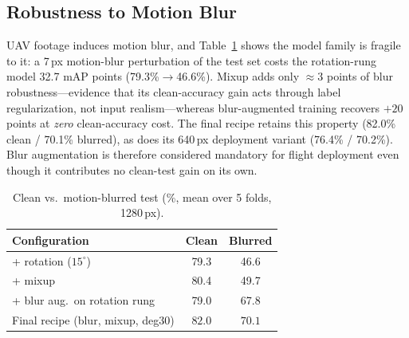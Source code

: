 
\subsection{Robustness to Motion Blur}
\label{sec:robust}
UAV footage induces motion blur, and Table~\ref{tab:blur} shows the model family is fragile to it: a 7\,px motion-blur perturbation of the test set costs the rotation-rung model 32.7 mAP points (79.3\%$\to$46.6\%). Mixup adds only ${\approx}3$ points of blur robustness---evidence that its clean-accuracy gain acts through label regularization, not input realism---whereas blur-augmented training recovers $+20$ points at \emph{zero} clean-accuracy cost. The final recipe retains this property (82.0\% clean / 70.1\% blurred), as does its 640\,px deployment variant (76.4\% / 70.2\%). Blur augmentation is therefore considered mandatory for flight deployment even though it contributes no clean-test gain on its own.

\begin{table}[t]
\caption{Clean vs.\ motion-blurred test \map{} (\%, mean over 5 folds, 1280\,px).}
\label{tab:blur}
\centering
\scriptsize
\setlength{\tabcolsep}{4pt}
\begin{tabular}{lcc}
\toprule
Configuration & Clean & Blurred \\
\midrule
+ rotation ($15^\circ$) & 79.3 & 46.6 \\
+ mixup & 80.4 & 49.7 \\
+ blur aug.\ on rotation rung & 79.0 & 67.8 \\
Final recipe (blur, mixup, deg30) & $\mathbf{82.0}$ & $\mathbf{70.1}$ \\
\bottomrule
\end{tabular}
\end{table}

